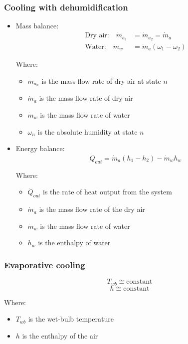 \documentclass[11pt]{article}
\begin{document}
 \newpage

\subsubsection{Cooling with dehumidification}
\label{sec:orgc8d4c41}
\begin{itemize}
\item Mass balance:
\begin{align*}
\text{Dry air:} \quad \dot{m}_{a_1} &= \dot{m}_{a_2} = \dot{m}_a \\
\text{Water:} \quad \dot{m}_w &= \dot{m}_a (\omega_1 - \omega_2)
\end{align*}

Where:
\begin{itemize}
\item \(\dot{m}_{a_n}\) is the mass flow rate of dry air at state \(n\)
\item \(\dot{m}_{a}\) is the mass flow rate of dry air
\item \(\dot{m}_w\) is the mass flow rate of water
\item \(\omega_n\) is the absolute humidity at state \(n\)
\end{itemize}

\item Energy balance:
\[\dot{Q}_{out} = \dot{m}_a (h_1 - h_2) - \dot{m}_w h_w\]

Where:
\begin{itemize}
\item \(\dot{Q}_{out}\) is the rate of heat output from the system
\item \(\dot{m}_a\) is the mass flow rate of the dry air
\item \(\dot{m}_w\) is the mass flow rate of water
\item \(h_w\) is the enthalpy of water
\end{itemize}
\end{itemize}

\subsubsection{Evaporative cooling}
\label{sec:org5bae8d5}
\[T_{wb} \cong \text{constant}\]
\[h \cong \text{constant}\]

Where:
\begin{itemize}
\item \(T_{wb}\) is the wet-bulb temperature
\item \(h\) is the enthalpy of the air
\end{itemize}
\end{document}
